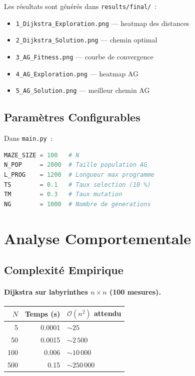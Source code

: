 \documentclass[12pt, a4paper]{article}
\theoremstyle{definition}
\theoremstyle{remark}
\newcommand{\bigO}[1]{\mathcal{O}\!\left(#1\right)}
\newcommand{\code}[1]{\texttt{#1}}
\begin{document}
Les résultats sont générés dans \code{results/final/}~:

\begin{itemize}[noitemsep]
    \item \code{1\_Dijkstra\_Exploration.png} — heatmap des distances
    \item \code{2\_Dijkstra\_Solution.png} — chemin optimal
    \item \code{3\_AG\_Fitness.png} — courbe de convergence
    \item \code{4\_AG\_Exploration.png} — heatmap AG
    \item \code{5\_AG\_Solution.png} — meilleur chemin AG
\end{itemize}

\subsection{Paramètres Configurables}

Dans \code{main.py}~:

\begin{lstlisting}[language=Python]
MAZE_SIZE = 100   # N
N_POP     = 2000  # Taille population AG
L_PROG    = 1200  # Longueur max programme
TS        = 0.1   # Taux selection (10 %)
TM        = 0.3   # Taux mutation
NG        = 1000  # Nombre de generations
\end{lstlisting}

\section{Analyse Comportementale}

\subsection{Complexité Empirique}

\paragraph{Dijkstra sur labyrinthes $n \times n$ (100 mesures).}

\begin{center}
\begin{tabular}{rrl}
    \toprule
    $N$ & Temps (s) & $\bigO{n^2}$ attendu \\
    \midrule
    5   & 0.0001 & $\sim 25$     \\
    50  & 0.0015 & $\sim 2\,500$ \\
    100 & 0.006  & $\sim 10\,000$\\
    500 & 0.15   & $\sim 250\,000$\\
    \bottomrule
\end{tabular}
\end{center}
\end{document}

